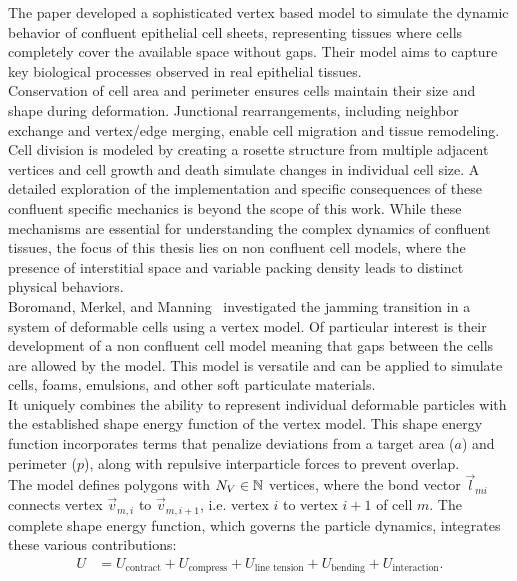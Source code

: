 The paper \cite{Fletcher14} developed a sophisticated vertex based model to simulate the dynamic behavior of confluent epithelial cell sheets, representing tissues where cells completely cover the available space without gaps. 
Their model aims to capture key biological processes observed in real epithelial tissues. \\
Conservation of cell area and perimeter ensures cells maintain their size and shape during deformation.
Junctional rearrangements, including neighbor exchange and vertex/edge merging, enable cell migration and tissue remodeling.
Cell division is modeled by creating a rosette structure from multiple adjacent vertices and cell growth and death simulate changes in individual cell size.
A detailed exploration of the implementation and specific consequences of these confluent specific mechanics is beyond the scope of this work.
While these mechanisms are essential for understanding the complex dynamics of confluent tissues, the focus of this thesis lies on non confluent cell models, where the presence of interstitial space and variable packing density leads to distinct physical behaviors. \\

Boromand, Merkel, and Manning~\cite{Boromand2018} investigated the jamming transition in a system of deformable cells using a vertex model. 
Of particular interest is their development of a non confluent cell model meaning that gaps between the cells are allowed by the model. 
This model is versatile and can be applied to simulate cells, foams, emulsions, and other soft particulate materials. \\
It uniquely combines the ability to represent individual deformable particles with the established shape energy function of the vertex model. 
This shape energy function incorporates terms that penalize deviations from a target area ($a$) and perimeter ($p$), along with repulsive interparticle forces to prevent overlap. \\
The model defines polygons with $N_V \in \mathbb{N}$ vertices, where the bond vector $\vec{l}_{mi}$ connects vertex $\vec{v}_{m,i}$ to $\vec{v}_{m,i+1}$, i.e. vertex $i$ to vertex $i+1$ of cell $m$.
The complete shape energy function, which governs the particle dynamics, integrates these various contributions:
\begin{align*}
	U &= U_{\text{contract}} + U_{\text{compress}} + U_{\text{line tension}} + U_{\text{bending}} + U_{\text{interaction}}.
\end{align*}


